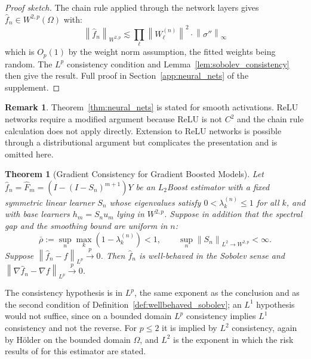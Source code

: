 \documentclass[12pt,a4paper]{article}
\numberwithin{equation}{section}
\theoremstyle{plain}
\newtheorem{theorem}{Theorem}
\theoremstyle{definition}
\newtheorem{remark}{Remark}
\newcommand{\norm}[1]{\left\| #1 \right\|}
\newcommand{\Wtwop}{W^{2,p}(\Omega)}
\newcommand{\fn}{\hat{f}_n}
\newcommand{\xrightarrowp}{\xrightarrow{p}}
\begin{document}
	\begin{proof}[Proof sketch]
		The chain rule applied through the network layers gives $\fn \in \Wtwop$ with:
		\begin{equation}
			\norm{\fn}_{W^{2,p}} \lesssim \prod_\ell \norm{W_\ell^{(n)}}^2 \cdot
			\norm{\sigma''}_\infty
		\end{equation}
		which is $O_p(1)$ by the weight norm assumption, the fitted weights being
		random. The $L^p$ consistency condition and
		Lemma~\ref{lem:sobolev_consistency} then give the result. Full proof
		in Section~\ref{app:neural_nets} of the supplement.
	\end{proof}
	
	\begin{remark}
		Theorem~\ref{thm:neural_nets} is stated for smooth activations. ReLU networks
		require a modified argument because ReLU is not $C^2$ and the chain rule calculation
		does not apply directly. Extension to ReLU networks is possible through a
		distributional argument but complicates the presentation and is omitted here.
	\end{remark}
	
	\begin{theorem}[Gradient Consistency for Gradient Boosted Models]
		\label{thm:boosting}
		Let $\fn = \hat{F}_m = (I - (I-S_n)^{m+1})Y$ be an $L_2$Boost estimator
		with a \emph{fixed} symmetric linear learner $S_n$ whose eigenvalues
		satisfy $0 < \lambda_k^{(n)} \leq 1$ for all $k$, and with base learners
		$h_m = S_n u_m$ lying in $W^{2,p}$. Suppose in addition that the
		spectral gap and the smoothing bound are \emph{uniform in $n$}:
		\begin{equation}
			\bar{\rho} := \sup_n \max_k \left(1 - \lambda_k^{(n)}\right) < 1,
			\qquad
			\sup_n \norm{S_n}_{L^2 \to W^{2,p}} < \infty .
			\label{eq:boost_uniform}
		\end{equation}
		Suppose $\norm{\fn - f}_{L^p} \xrightarrowp 0$. Then $\fn$ is
		well-behaved in the Sobolev sense and
		$\norm{\nabla \fn - \nabla f}_{L^p} \xrightarrowp 0$.
	\end{theorem}

	The consistency hypothesis is in $L^p$, the same exponent as the
	conclusion and as the second condition of
	Definition~\ref{def:wellbehaved_sobolev}; an $L^1$ hypothesis would not
	suffice, since on a bounded domain $L^p$ consistency implies $L^1$
	consistency and not the reverse. For $p \leq 2$ it is implied by $L^2$
	consistency, again by H\"{o}lder on the bounded domain $\Omega$, and $L^2$
	is the exponent in which the risk results of \citet{buhlmann2003boosting}
	for this estimator are stated.
	
\end{document}
